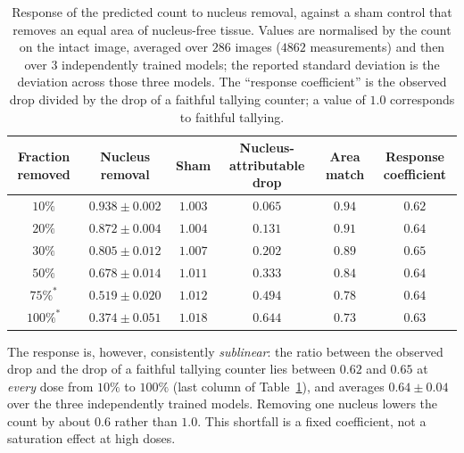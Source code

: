 \documentclass[pdflatex,sn-mathphys-num]{sn-jnl}
\begin{document}
\begin{table}[!htbp]
\centering
\caption{Response of the predicted count to nucleus removal, against a sham control that removes an equal area
of nucleus-free tissue. Values are normalised by the count on the intact image, averaged over $286$ images
($4862$ measurements) and then over $3$ independently trained models; the reported standard deviation is the
deviation across those three models. The ``response coefficient'' is the observed drop divided by the drop of a
faithful tallying counter; a value of $1.0$ corresponds to faithful tallying.}\label{tab:doseresp}
\begin{tabular}{@{}cccccc@{}}
\toprule
Fraction removed & Nucleus removal & Sham & Nucleus-attributable drop & Area match & Response coefficient \\
\midrule
$10\%$  & $0.938\pm0.002$ & $1.003$ & $0.065$ & $0.94$ & $0.62$ \\
$20\%$  & $0.872\pm0.004$ & $1.004$ & $0.131$ & $0.91$ & $0.64$ \\
$30\%$  & $0.805\pm0.012$ & $1.007$ & $0.202$ & $0.89$ & $0.65$ \\
$50\%$  & $0.678\pm0.014$ & $1.011$ & $0.333$ & $0.84$ & $0.64$ \\
$75\%^{\ast}$  & $0.519\pm0.020$ & $1.012$ & $0.494$ & $0.78$ & $0.64$ \\
$100\%^{\ast}$ & $0.374\pm0.051$ & $1.018$ & $0.644$ & $0.73$ & $0.63$ \\
\bottomrule
\end{tabular}
\end{table}

The response is, however, consistently \emph{sublinear}: the ratio between the observed drop and the drop of a
faithful tallying counter lies between $0.62$ and $0.65$ at \emph{every} dose from $10\%$ to $100\%$ (last
column of Table~\ref{tab:doseresp}), and averages $0.64 \pm 0.04$ over the three independently trained models.
Removing one nucleus lowers the count by about $0.6$ rather than $1.0$. This shortfall is a fixed coefficient,
not a saturation effect at high doses.
\end{document}
